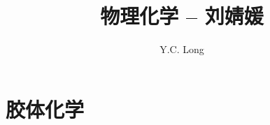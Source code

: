 \documentclass[a4paper]{ctexrep}
\author{Y.C. Long}
\title{物理化学 -- 刘婧媛}
\begin{document}
\maketitle
\tableofcontents






\chapter{胶体化学}
\end{document}
